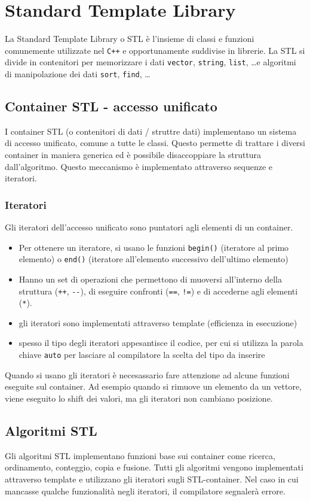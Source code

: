 \documentclass[a4paper]{article}
\begin{document}
\section{Standard Template Library}
La Standard Template Library o STL è l'insieme di classi e funzioni comunemente utilizzate nel \verb|C++| e opportunamente suddivise
in librerie. La STL si divide in contenitori per memorizzare i dati \verb|vector|, \verb|string|, \verb|list|, \dots e algoritmi di
manipolazione dei dati \verb|sort|, \verb|find|, \dots

\subsection{Container STL - accesso unificato}
I container STL (o contenitori di dati / struttre dati) implementano un sistema di accesso unificato, comune a tutte le classi. 
Questo permette di trattare i diversi container in maniera generica ed è possibile disaccoppiare la struttura dall'algoritmo.
Questo meccanismo è implementato attraverso sequenze e iteratori.

\subsubsection*{Iteratori}
Gli iteratori dell'accesso unificato sono puntatori agli elementi di un container. 
\begin{itemize}
	\item Per ottenere un iteratore, si usano le funzioni \verb|begin()| (iteratore al primo elemento) o \verb|end()| (iteratore
	all'elemento successivo dell'ultimo elemento)
	\item Hanno un set di operazioni che permettono di muoversi all'interno della struttura (\verb|++|, \verb|--|), di eseguire
	confronti (\verb|==|, \verb|!=|) e di accederne agli elementi (\verb|*|).
	\item gli iteratori sono implementati attraverso template (efficienza in esecuzione)
	\item spesso il tipo degli iteratori appesantisce il codice, per cui si utilizza la parola chiave \verb|auto| per lasciare
	al compilatore la scelta del tipo da inserire
\end{itemize}
Quando si usano gli iteratori è necesassario fare attenzione ad alcune funzioni eseguite sul container. Ad esempio quando si
rimuove un elemento da un vettore, viene eseguito lo shift dei valori, ma gli iteratori non cambiano posizione.

\subsection{Algoritmi STL}
Gli algoritmi STL implementano funzioni base sui container come ricerca, ordinamento, conteggio, copia e fusione. Tutti gli
algoritmi vengono implementati attraverso template e utilizzano gli iteratori sugli STL-container. Nel caso in cui mancasse
qualche funzionalità negli iteratori, il compilatore segnalerà errore.
\end{document}
